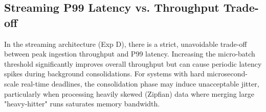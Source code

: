 \subsection{Streaming P99 Latency vs. Throughput Trade-off}
In the streaming architecture (Exp D), there is a strict, unavoidable trade-off between peak ingestion throughput and P99 latency. Increasing the micro-batch threshold significantly improves overall throughput but can cause periodic latency spikes during background consolidations. For systems with hard microsecond-scale real-time deadlines, the consolidation phase may induce unacceptable jitter, particularly when processing heavily skewed (Zipfian) data where merging large "heavy-hitter" runs saturates memory bandwidth.

